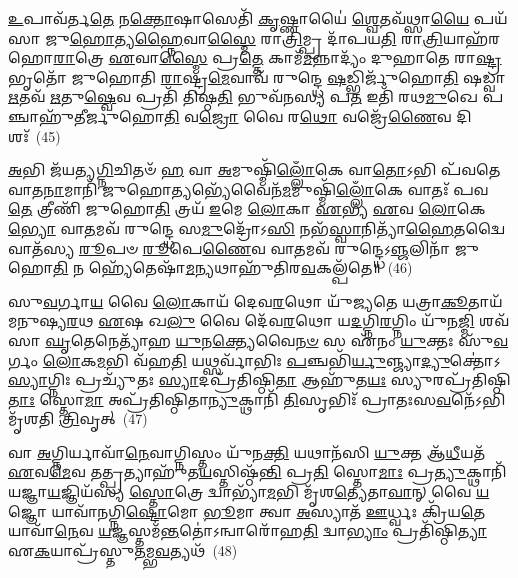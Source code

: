 \-\ul{𑌉}\-𑌪𑌾𑌵᳴𑌰𑍍𑌤\-\ul{𑌤𑍇} 𑌨\-\ul{𑌕𑍍𑌤𑍋}\-𑌷𑌾𑌸𑍇𑌤𑌿᳴ \ul{𑌕𑍃}\-𑌷𑍍𑌣𑌾𑌯𑍈॑ \ul{𑌶𑍍𑌵𑍇}\-𑌤𑌵᳴𑌥𑍍𑌸𑌾\-\ul{𑌯𑍈} 𑌪𑌯᳴𑌸𑌾 𑌜𑍁\-\ul{𑌹𑍋}\-𑌤𑍍𑌯\-\ul{𑌹𑍍𑌨𑍈}\-𑌵𑌾\-\ul{𑌸𑍍𑌮𑍈} 𑌰𑌾\-\ul{𑌤𑍍𑌰𑌿}\-𑌮𑍍𑌪𑍍𑌰 𑌦𑌾᳴𑌪𑌯\-\ul{𑌤𑌿} 𑌰𑌾\-\ul{𑌤𑍍𑌰𑌿}\-𑌯𑌾𑌹᳴𑌰𑌹𑍋\-\ul{𑌰𑌾}\-𑌤𑍍𑌰𑍇 \ul{𑌏}\-𑌵𑌾\-\ul{𑌸𑍍𑌮𑍈} 𑌪𑍍𑌰\-\ul{𑌤𑍍𑌤𑍇} 𑌕𑌾𑌮᳴\-\ul{𑌮}\-𑌨𑍍𑌨𑌾𑌦𑍍𑌯𑌂᳴ 𑌦𑍁𑌹𑌾𑌤𑍇 𑌰𑌾\-\ul{𑌷𑍍𑌟𑍍𑌰}\-𑌭𑍃𑌤𑍋᳴ 𑌜𑍁𑌹𑍋𑌤𑌿 \ul{𑌰𑌾}\-𑌷𑍍𑌟𑍍𑌰\-\ul{𑌮𑍇}\-𑌵𑌾𑌵᳴ 𑌰𑍁𑌨𑍍𑌦𑍍𑌧𑍇 \ul{𑌷}\-𑌡𑍍𑌭𑌿𑌰𑍍𑌜𑍁᳴𑌹𑍋\-\ul{𑌤𑌿} 𑌷𑌡𑍍𑌵𑌾 \ul{𑌋}\-𑌤𑌵᳴ \ul{𑌋}\-𑌤𑍁\-\ul{𑌷𑍍𑌵𑍇}\-𑌵 𑌪𑍍𑌰𑌤𑌿᳴ 𑌤𑌿𑌷𑍍𑌠\-\ul{𑌤𑌿} 𑌭𑍁𑌵᳴𑌨𑌸𑍍𑌯 𑌪\-\ul{𑌤} 𑌇𑌤𑌿᳴ 𑌰𑌥\-\ul{𑌮𑍁}\-𑌖𑍇 𑌪𑌞𑍍𑌚𑌾𑌹𑍁᳴𑌤𑍀𑌰𑍍𑌜𑍁𑌹𑍋\-\ul{𑌤𑌿} 𑌵\-\ul{𑌜𑍍𑌰𑍋} 𑌵𑍈 𑌰\-\ul{𑌥𑍋} 𑌵𑌜𑍍𑌰𑍇᳴\-\ul{𑌣𑍈}\-𑌵 𑌦𑌿𑌶𑌃᳴~(45)

\-\ul{𑌅}\-𑌭𑌿 𑌜᳴𑌯𑌤𑍍𑌯\-\ul{𑌗𑍍𑌨𑌿}\-𑌚𑌿𑌤𑍞᳴ \ul{𑌹} 𑌵𑌾 \ul{𑌅}\-𑌮𑍁𑌷𑍍𑌮𑌿᳴\-\ul{𑌲𑍍𑌲𑍋𑌁}\-𑌕𑍇 𑌵𑌾\-\ul{𑌤𑍋}\-\-𑌽𑌭𑌿 𑌪᳴𑌵𑌤𑍇 𑌵𑌾𑌤\-\ul{𑌨𑌾}\-𑌮𑌾𑌨𑌿᳴ 𑌜𑍁𑌹𑍋\-\ul{𑌤𑍍𑌯}\-𑌭𑍍𑌯𑍇᳴𑌵𑍈𑌨᳴\-\ul{𑌮}\-𑌮𑍁𑌷𑍍𑌮𑌿᳴\-\ul{𑌲𑍍𑌲𑍋𑌁}\-𑌕𑍇 𑌵𑌾𑌤𑌃᳴ 𑌪𑌵\-\ul{𑌤𑍇} 𑌤𑍍𑌰𑍀𑌣𑌿᳴ 𑌜𑍁𑌹𑍋\-\ul{𑌤𑌿} 𑌤𑍍𑌰𑌯᳴ \ul{𑌇}\-𑌮𑍇 \ul{𑌲𑍋}\-𑌕𑌾 \ul{𑌏}\-𑌭𑍍𑌯 \ul{𑌏}\-𑌵 \ul{𑌲𑍋}\-𑌕𑍇\-\ul{𑌭𑍍𑌯𑍋} 𑌵𑌾\-\ul{𑌤}\-𑌮𑌵᳴ 𑌰𑍁𑌨𑍍𑌦𑍍𑌧𑍇 𑌸\-\ul{𑌮𑍁}\-𑌦𑍍𑌰𑍋᳴\-𑌽\-\ul{𑌸𑌿} 𑌨𑌭᳴\-\ul{𑌸𑍍𑌵𑌾}\-𑌨𑌿𑌤𑍍𑌯𑌾᳴\-\ul{𑌹𑍈}\-𑌤𑌦𑍍𑌵𑍈 𑌵𑌾𑌤᳴𑌸𑍍𑌯 \ul{𑌰𑍂}\-𑌪𑍞 \ul{𑌰𑍂}\-𑌪𑍇\-\ul{𑌣𑍈}\-𑌵 𑌵𑌾\-\ul{𑌤}\-𑌮𑌵᳴ 𑌰𑍁𑌨𑍍𑌦𑍍𑌧𑍇\-𑌽\-\ul{𑌞𑍍𑌜}\-𑌲𑌿𑌨𑌾᳴ 𑌜𑍁𑌹𑍋\-\ul{𑌤𑌿} 𑌨 𑌹𑍍𑌯𑍇᳴𑌤𑍇𑌷𑌾᳴\-\ul{𑌮}\-𑌨𑍍𑌯𑌥𑌾𑌹𑍁᳴𑌤𑌿𑌰\-\ul{𑌵}\-𑌕𑌲𑍍𑌪᳴𑌤𑍇॥~(46)

{\anuvakamend[{𑌓𑌷᳴𑌧𑌯𑌃 \ul{𑌸}\-𑌪𑍍𑌤𑌾𑌭𑌿 𑌦𑌿\-\ul{𑌶𑍋}\-\-𑌽𑌨𑍍𑌯\-\ul{𑌥𑌾} 𑌦𑍍𑌵𑍇 𑌚᳴}]}%

𑌸𑍁\-\ul{𑌵}\-𑌰𑍍𑌗𑌾\-\ul{𑌯} 𑌵𑍈 \ul{𑌲𑍋}\-𑌕𑌾𑌯᳴ 𑌦𑍇𑌵\-\ul{𑌰}\-𑌥𑍋 𑌯𑍁᳴𑌜𑍍𑌯𑌤𑍇 𑌯𑌤𑍍𑌰𑌾\-\ul{𑌕𑍂}\-𑌤𑌾𑌯᳴ 𑌮𑌨𑍁𑌷𑍍𑌯\-\ul{𑌰}\-𑌥 \ul{𑌏}\-𑌷 𑌖\-\ul{𑌲𑍁} 𑌵𑍈 𑌦𑍇᳴𑌵\-\ul{𑌰}\-𑌥𑍋 𑌯\-\ul{𑌦}\-𑌗𑍍𑌨𑌿\-\ul{𑌰}\-𑌗𑍍𑌨𑌿𑌂 𑌯𑍁᳴𑌨\-\ul{𑌜𑍍𑌮𑌿} 𑌶𑌵᳴𑌸𑌾 \ul{𑌘𑍃}\-𑌤𑍇𑌨𑍇𑌤𑍍𑌯𑌾᳴𑌹 \ul{𑌯𑍁}\-𑌨\-\ul{𑌕𑍍𑌤𑍍𑌯𑍇}\-𑌵𑍈\-\ul{𑌨}\-\-\ul{𑍞} 𑌸 𑌏᳴𑌨𑌂 \ul{𑌯𑍁}\-𑌕𑍍𑌤𑌃 𑌸𑍁᳴\-\ul{𑌵}\-𑌰𑍍𑌗𑌂 \ul{𑌲𑍋}\-𑌕\-\ul{𑌮}\-𑌭𑌿 𑌵᳴𑌹\-\ul{𑌤𑌿} 𑌯𑌥𑍍𑌸𑌰𑍍𑌵𑌾᳴𑌭𑌿𑌃 \ul{𑌪}\-𑌞𑍍𑌚𑌭𑌿᳴\-\ul{𑌰𑍍𑌯𑍁}\-𑌞𑍍𑌜𑍍𑌯𑌾\-\ul{𑌦𑍍𑌯𑍁}\-𑌕𑍍𑌤𑍋॑\-𑌽\-\ul{𑌸𑍍𑌯𑌾}\-𑌗𑍍𑌨𑌿𑌃 𑌪𑍍𑌰𑌚𑍍𑌯𑍁᳴𑌤𑌃 \ul{𑌸𑍍𑌯𑌾}\-𑌦𑌪𑍍𑌰᳴𑌤𑌿𑌷𑍍𑌠𑌿\-\ul{𑌤𑌾} 𑌆𑌹𑍁᳴𑌤\-\ul{𑌯𑌃} 𑌸𑍍𑌯𑍁𑌰𑌪𑍍𑌰᳴𑌤𑌿𑌷𑍍𑌠𑌿\-\ul{𑌤𑌾𑌃} 𑌸𑍍𑌤𑍋\-\ul{𑌮𑌾} 𑌅𑌪𑍍𑌰᳴𑌤𑌿𑌷𑍍𑌠𑌿𑌤𑌾\-\ul{𑌨𑍍𑌯𑍁}\-𑌕𑍍𑌥𑌾𑌨𑌿᳴ \ul{𑌤𑌿}\-𑌸𑍃𑌭𑌿𑌃᳴ 𑌪𑍍𑌰𑌾𑌤𑌃𑌸\-\ul{𑌵}\-𑌨𑍇᳴\-𑌽𑌭𑌿 𑌮𑍃᳴𑌶𑌤𑌿 \ul{𑌤𑍍𑌰𑌿}\-𑌵𑍃𑌤𑍍~(47)

𑌵𑌾 \ul{𑌅}\-𑌗𑍍𑌨𑌿𑌰𑍍𑌯𑌾𑌵𑌾᳴\-\ul{𑌨𑍇}\-𑌵𑌾𑌗𑍍𑌨𑌿𑌸𑍍𑌤𑌂 𑌯𑍁᳴𑌨\-\ul{𑌕𑍍𑌤𑌿} 𑌯𑌥𑌾𑌨᳴𑌸𑌿 \ul{𑌯𑍁}\-𑌕𑍍𑌤 𑌆᳴\-\ul{𑌧𑍀}\-𑌯𑌤᳴ \ul{𑌏}\-𑌵\-\ul{𑌮𑍇}\-𑌵 𑌤𑌤𑍍𑌪𑍍𑌰𑌤𑍍𑌯𑌾𑌹𑍁᳴𑌤\-\ul{𑌯}\-𑌸𑍍𑌤𑌿𑌷𑍍𑌠᳴\-\ul{𑌨𑍍𑌤𑌿} 𑌪𑍍𑌰\-\ul{𑌤𑌿} 𑌸𑍍𑌤𑍋\-\ul{𑌮𑌾𑌃} 𑌪𑍍𑌰\-\ul{𑌤𑍍𑌯𑍁}\-𑌕𑍍𑌥𑌾𑌨𑌿᳴ 𑌯𑌜𑍍𑌞𑌾\-\ul{𑌯}\-𑌜𑍍𑌞𑌿𑌯᳴𑌸𑍍𑌯 \ul{𑌸𑍍𑌤𑍋}\-𑌤𑍍𑌰𑍇 𑌦𑍍𑌵𑌾𑌭𑍍𑌯𑌾᳴\-\ul{𑌮}\-𑌭𑌿 𑌮𑍃᳴𑌶\-\ul{𑌤𑍍𑌯𑍇}\-𑌤𑌾\-\ul{𑌵𑌾}\-𑌨𑍍 𑌵𑍈 \ul{𑌯}\-𑌜𑍍𑌞𑍋 𑌯𑌾𑌵𑌾᳴𑌨𑌗𑍍𑌨𑌿\-\ul{𑌷𑍍𑌟𑍋}\-𑌮𑍋 \ul{𑌭𑍂}\-𑌮𑌾 𑌤𑍍𑌵𑌾 \ul{𑌅}\-𑌸𑍍𑌯𑌾𑌤᳴ \ul{𑌊}\-𑌰𑍍𑌧𑍍𑌵𑌃 𑌕𑍍𑌰𑌿᳴𑌯\-\ul{𑌤𑍇} 𑌯𑌾𑌵𑌾᳴\-\ul{𑌨𑍇}\-𑌵 \ul{𑌯}\-𑌜𑍍𑌞𑌸𑍍𑌤𑌮᳴\-\ul{𑌨𑍍𑌤}\-𑌤𑍋॑\-𑌽𑌨𑍍𑌵𑌾𑌰𑍋᳴𑌹\-\ul{𑌤𑌿} 𑌦𑍍𑌵𑌾\-\ul{𑌭𑍍𑌯𑌾𑌂} 𑌪𑍍𑌰𑌤𑌿᳴𑌷𑍍𑌠𑌿\-\ul{𑌤𑍍𑌯𑌾} 𑌏\-\ul{𑌕}\-𑌯𑌾𑌪𑍍𑌰᳴𑌸𑍍𑌤𑍁\-\ul{𑌤}\-𑌮𑍍𑌭\-\ul{𑌵}\-𑌤𑍍𑌯𑌥᳴~(48)

